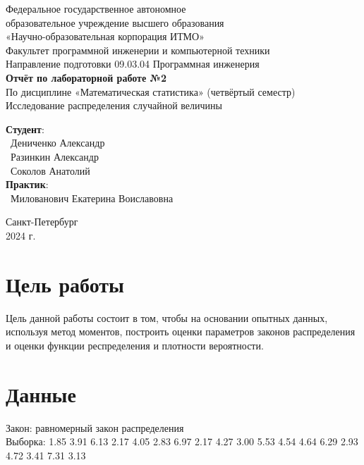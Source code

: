 \documentclass{article}
\begin{document}
\begin{center}
    \Large
    Федеральное государственное автономное \\
    образовательное учреждение высшего образования \\ 
    «Научно-образовательная корпорация ИТМО»\\
    \vspace{0.5cm}
    \large
    Факультет программной инженерии и компьютерной техники \\
    Направление подготовки 09.03.04 Программная инженерия \\
    \vspace{1cm}
    \Large
    \textbf{Отчёт по лабораторной работе №2} \\
    По дисциплине «Математическая статистика» (четвёртый семестр)\\
    Исследование распределения случайной величины\\
    \large
    \vspace{8cm}

    \begin{minipage}{.33\textwidth}
    \end{minipage}
    \hfill
    \begin{minipage}{.4\textwidth}
    
        \textbf{Студент}: \vspace{.1cm} \\
        \ Дениченко Александр\\
        \ Разинкин Александр\\
        \ Соколов Анатолий\\
        \textbf{Практик}:  \\
        \ Милованович Екатерина Воиславовна
    \end{minipage}
    \vfill
Санкт-Петербург\\ 2024 г.
\end{center}
\thispagestyle{empty}

\newpage
\section*{Цель работы}
Цель данной работы состоит в том, чтобы на основании опытных данных, используя метод моментов, построить оценки параметров законов распределения и оценки функции респределения и плотности вероятности.
\section*{Данные }
Закон: равномерный закон распределения\\
Выборка: 1.85 3.91 6.13 2.17 4.05 2.83 6.97 2.17 4.27 3.00 5.53 4.54 4.64 6.29 2.93 4.72 3.41 7.31 3.13
\end{document}

